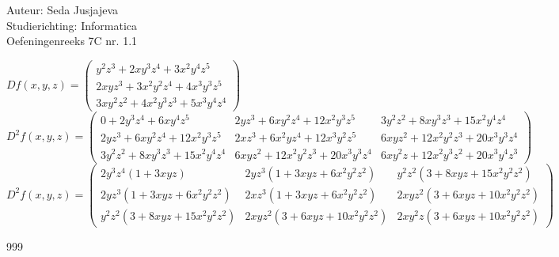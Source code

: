 \documentclass[a4paper]{article}
\begin{document}
\noindent \large Auteur: Seda Jusjajeva\\
\noindent \large Studierichting: Informatica\\
\noindent \large Oefeningenreeks 7C nr. 1.1\\

\medskip

\normalsize


$Df(x, y, z) = \left(\begin{array}{c}
    y^2z^3   + 2xy^3z^4    + 3x^2y^4z^5 \\
    2xyz^3   + 3x^2y^2z^4 + 4x^3y^3z^5 \\
    3xy^2z^2 + 4x^2y^3z^3 + 5x^3y^4z^4
\end{array}\right)$ \\

$D^2f(x, y, z) = \left(\begin{array}{ccc}
    0       + 2y^3z^4  + 6xy^4z^5    & 2yz^3  + 6xy^2z^4    + 12x^2y^3z^5 & 3y^2z^2 + 8xy^3z^3    + 15x^2y^4z^4 \\
    2yz^3   + 6xy^2z^4 + 12x^2y^3z^5 & 2xz^3  + 6x^2yz^4    + 12x^3y^2z^5 & 6xyz^2  + 12x^2y^2z^3 + 20x^3y^3z^4 \\
    3y^2z^2 + 8xy^3z^3 + 15x^2y^4z^4 & 6xyz^2 + 12x^2y^2z^3 + 20x^3y^3z^4 & 6xy^2z  + 12x^2y^3z^2 + 20x^3y^4z^3
\end{array}\right)$ \\

$D^2f(x, y, z) = \left(\begin{array}{ccc}
    2y^3z^4\left(1 + 3xyz\right)              & 2yz^3\left(1 + 3xyz + 6x^2y^2z^2\right)   & y^2z^2\left(3 + 8xyz + 15x^2y^2z^2\right) \\
    2yz^3\left(1 + 3xyz + 6x^2y^2z^2\right)   & 2xz^3\left(1 + 3xyz + 6x^2y^2z^2\right)   & 2xyz^2\left(3 + 6xyz + 10x^2y^2z^2\right) \\
    y^2z^2\left(3 + 8xyz + 15x^2y^2z^2\right) & 2xyz^2\left(3 + 6xyz + 10x^2y^2z^2\right) & 2xy^2z\left(3 + 6xyz + 10x^2y^2z^2\right)
\end{array}\right)$ \\




\begin{thebibliography}{999}
\end{thebibliography}
\end{document}
